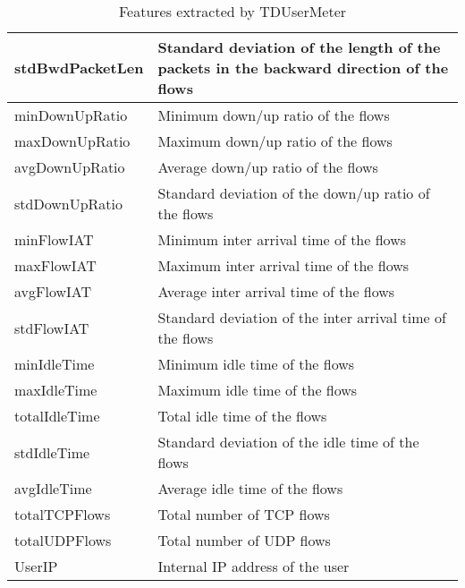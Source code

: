 \begin{table}[H]
\begin{tabular}{|l|l|}
stdBwdPacketLen & Standard deviation of the length of the packets in the backward direction of the flows \\ \hline
minDownUpRatio & Minimum down/up ratio of the flows \\ \hline
maxDownUpRatio & Maximum down/up ratio of the flows \\ \hline
avgDownUpRatio & Average down/up ratio of the flows \\ \hline
stdDownUpRatio & Standard deviation of the down/up ratio of the flows \\ \hline
minFlowIAT & Minimum inter arrival time of the flows \\ \hline
maxFlowIAT & Maximum inter arrival time of the flows \\ \hline
avgFlowIAT & Average inter arrival time of the flows \\ \hline
stdFlowIAT & Standard deviation of the inter arrival time of the flows \\ \hline
minIdleTime & Minimum idle time of the flows \\ \hline
maxIdleTime & Maximum idle time of the flows \\ \hline
totalIdleTime & Total idle time of the flows \\ \hline
stdIdleTime & Standard deviation of the idle time of the flows \\ \hline
avgIdleTime & Average idle time of the flows \\ \hline
totalTCPFlows & Total number of TCP flows \\ \hline
totalUDPFlows & Total number of UDP flows \\ \hline
UserIP & Internal IP address of the user \\ \hline
\end{tabular}
\caption{Features extracted by TDUserMeter}


\end{table}